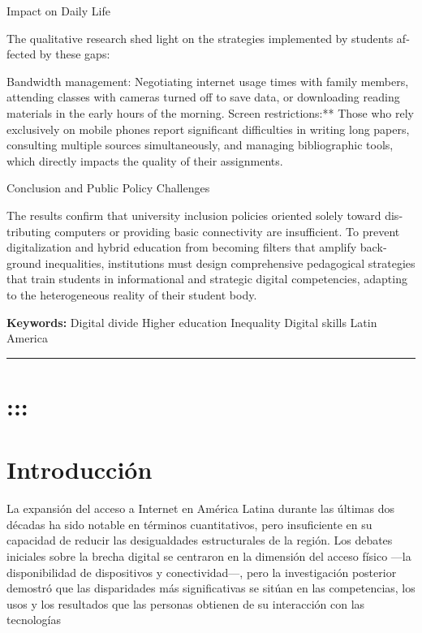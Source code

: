 \begin{tcolorbox}[colback=brown!8!white,colframe=brown!8!white,boxrule=0pt,arc=2pt,left=4pt,right=4pt,top=3pt,bottom=3pt,before skip=4pt,after skip=4pt]
\begin{otherlanguage}{english}
Impact on Daily Life

The qualitative research shed light on the strategies implemented by students affected by these gaps:

Bandwidth management: Negotiating internet usage times with family members, attending classes with cameras turned off to save data, or downloading reading materials in the early hours of the morning.
Screen restrictions:** Those who rely exclusively on mobile phones report significant difficulties in writing long papers, consulting multiple sources simultaneously, and managing bibliographic tools, which directly impacts the quality of their assignments.

Conclusion and Public Policy Challenges

The results confirm that university inclusion policies oriented solely toward distributing computers or providing basic connectivity are insufficient. To prevent digitalization and hybrid education from becoming filters that amplify background inequalities, institutions must design comprehensive pedagogical strategies that train students in informational and strategic digital competencies, adapting to the heterogeneous reality of their student body.
\par\smallskip\noindent\textbf{Keywords:} Digital divide Higher education Inequality Digital skills Latin America
\end{otherlanguage}
\end{tcolorbox}

\bigskip
\noindent\rule{\linewidth}{0.4pt}
\bigskip

\section{:::}

\section{Introducción}
La expansión del acceso a Internet en América Latina durante las últimas dos décadas ha sido notable en términos cuantitativos, pero insuficiente en su capacidad de reducir las desigualdades estructurales de la región. Los debates iniciales sobre la brecha digital se centraron en la dimensión del acceso físico —la disponibilidad de dispositivos y conectividad—, pero la investigación posterior demostró que las disparidades más significativas se sitúan en las competencias, los usos y los resultados que las personas obtienen de su interacción con las tecnologías \autocite{2562-WARSCHAUER2024} \autocite*{2565-HARGITTAI2002}

